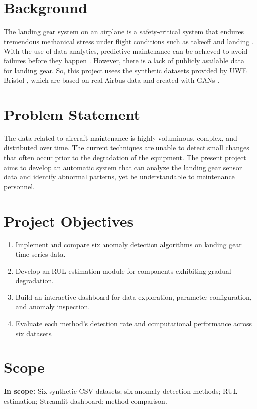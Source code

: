 \documentclass{CLS_zhou430}
\begin{document}
\section{Background}
The landing gear system on an airplane is a safety-critical system that endures tremendous mechanical stress under flight conditions such as takeoff and landing \cite{do2004proactive}. With the use of data analytics, predictive maintenance can be achieved to avoid failures before they happen \cite{compare2020challenges}. However, there is a lack of publicly available data for landing gear. So, this project usees the synthetic datasets provided by UWE Bristol \cite{uwe2023landing}, which are based on real Airbus data and created with GANs \cite{goodfellow2014generative}.

\section{Problem Statement}
The data related to aircraft maintenance is highly voluminous, complex, and distributed over time. The current techniques are unable to detect small changes that often occur prior to the degradation of the equipment. The present project aims to develop an automatic system that can analyze the landing gear sensor data and identify abnormal patterns, yet be understandable to maintenance personnel.

\section{Project Objectives}
\begin{enumerate}
    \item Implement and compare six anomaly detection algorithms on landing gear time-series data.
    \item Develop an RUL estimation module for components exhibiting gradual degradation.
    \item Build an interactive dashboard for data exploration, parameter configuration, and anomaly inspection.
    \item Evaluate each method's detection rate and computational performance across six datasets.
\end{enumerate}

\section{Scope}
\textbf{In scope:} Six synthetic CSV datasets; six anomaly detection methods; RUL estimation; Streamlit dashboard; method comparison.
\end{document}
